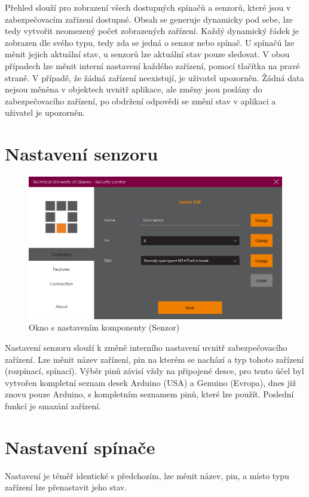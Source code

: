 \documentclass[FM,DP]{tulthesis}  %
\begin{document}
Přehled slouží pro zobrazení všech dostupných spínačů a senzorů, které jsou v zabezpečovacím zařízení dostupné. Obsah se generuje dynamicky pod sebe, lze tedy vytvořit neomezený počet zobrazených zařízení. Každý dynamický řádek je zobrazen dle svého typu, tedy zda se jedná o senzor nebo spínač. U spínačů lze měnit jejich aktuální stav, u senzorů lze aktuální stav pouze sledovat. V obou případech lze měnit interní nastavení každého zařízení, pomocí tlačítka na pravé straně. V případě, že žádná zařízení neexistují, je uživatel upozorněn. Žádná data nejsou měněna v objektech uvnitř aplikace, ale změny jsou poslány do zabezpečovacího zařízení, po obdržení odpovědi se změní stav v aplikaci a uživatel je upozorněn.

\section{Nastavení senzoru}

\begin{figure}[H]
\begin{center}
\includegraphics[width=\textwidth]{images/settings.png}
\caption{Okno s nastavením komponenty (Senzor)}
\label{image}
\end{center}
\end{figure}

Nastavení senzoru slouží k změně interního nastavení uvnitř zabezpečovacího zařízení. Lze měnit název zařízení, pin na kterém se nachází a typ tohoto zařízení (rozpínací, spínací). Výběr pinů závisí vždy na připojené desce, pro tento účel byl vytvořen kompletní seznam desek Arduino (USA) a Genuino (Evropa), dnes již znovu pouze Arduino, s kompletním seznamem pinů, které lze použít. Poslední funkcí je smazání zařízení.

\section{Nastavení spínače}
Nastavení je téměř identické s předchozím, lze měnit název, pin, a místo typu zařízení lze přenastavit jeho stav.
\end{document}
